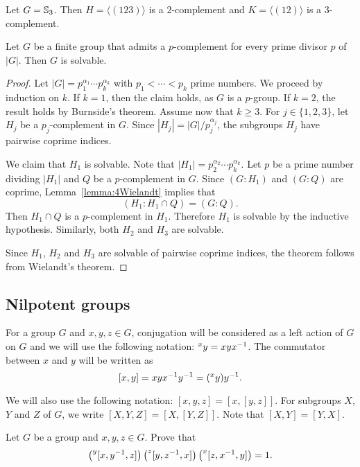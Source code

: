 \begin{example}
Let $G=\mathbb{S}_3$. Then $H=\langle (123)\rangle$ is a $2$-complement and 
$K=\langle (12)\rangle$ is a $3$-complement.
\end{example}

\begin{theorem}[Hall]
\label{theorem:Hall:solvable}
Let $G$ be a finite group that admits a $p$-complement for every prime divisor $p$ of $|G|$. 
Then $G$ is solvable. 
\end{theorem}

\begin{proof}
	Let $|G|=p_1^{\alpha_1}\cdots
	p_k^{\alpha_k}$ with $p_1<\cdots<p_k$ prime numbers. We proceed by induction on $k$. 
	If $k=1$, then the claim holds, as $G$ is a $p$-group. If $k=2$, the result holds by
        Burnside's theorem. Assume now that 
	$k\geq3$. For $j\in\{1,2,3\}$, let $H_j$ be a $p_j$-complement in 
	$G$. Since $|H_j|=|G|/p_j^{\alpha_j}$, the subgroups $H_j$ have pairwise coprime indices.

	We claim that $H_1$ is solvable. Note that $|H_1|=p_2^{\alpha_2}\cdots
	p_k^{\alpha_k}$. Let $p$ be a prime number dividing $|H_1|$ and $Q$ be a 
	$p$-complement in $G$. 
	Since $(G:H_1)$ and $(G:Q)$ are
	coprime, Lemma~\ref{lemma:4Wielandt} implies that  
	\[
	(H_1:H_1\cap Q)=(G:Q). 
	\]
	Then $H_1\cap Q$ is a $p$-complement in $H_1$.  Therefore $H_1$ is
	solvable by the inductive hypothesis. Similarly, both $H_2$ and 
	$H_3$ are solvable.

	Since $H_1$, $H_2$ and $H_3$ are solvable of pairwise coprime indices, 
        the theorem follows from Wielandt's theorem. 
\end{proof}

\subsection{Nilpotent groups}

For a group $G$ and $x,y,z\in G$, conjugation will be considered as a left action of $G$ on $G$ 
and we will use the following notation: $\prescript{x}{}y=xyx^{-1}$. The commutator between $x$ and $y$ 
will be written as 
\[
[x,y]=xyx^{-1}y^{-1}=(\prescript{x}{}y)y^{-1}.
\]

We will also use the following notation:  
$[x,y,z]=[x,[y,z]]$. For subgroups $X$, $Y$ and $Z$ of $G$, we write 
$[X,Y,Z]=\left[ X,[Y,Z] \right]$. Note that $[X,Y]=[Y,X]$. 

\begin{exercise}
	\label{exercise:HallWitt}
	Let $G$ be a group and $x,y,z\in G$. Prove that 
	\begin{equation}
		\label{eq:HallWitt}
	\left(\prescript{y}{}[x,y^{-1},z]\right)\left(\prescript{z}{}[y,z^{-1},x]\right)\left(\prescript{x}{}[z,x^{-1},y]\right)=1.
	\end{equation}
\end{exercise}

